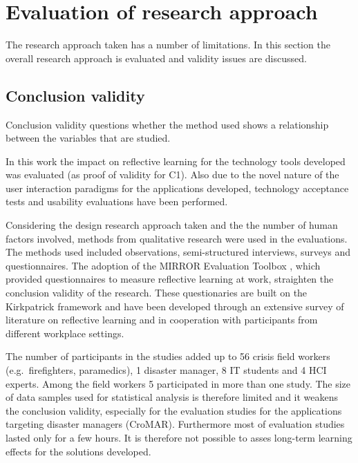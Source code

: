 \section{Evaluation of research approach}\label{evaluation-of-research-approach}

The research approach taken has a number of limitations. In this section the overall research approach is evaluated and validity issues are discussed.

\subsection{Conclusion validity}\label{conclusion-validity}

Conclusion validity questions whether the method used shows a relationship between the variables that are studied.

In this work the impact on reflective learning for the technology tools developed was evaluated (as proof of validity for C1). Also due to the novel nature of the user interaction paradigms for the applications developed, technology acceptance tests and usability evaluations have been performed.

Considering the design research approach taken and the the number of human factors involved, methods from qualitative research were used in the evaluations. The methods used included observations, semi-structured interviews, surveys and questionnaires. The adoption of the MIRROR Evaluation Toolbox \autocite{Renner:v4nLmwOk}, which provided questionnaires to measure reflective learning at work, straighten the conclusion validity of the research. These questionaries are built on the Kirkpatrick framework \autocite{kirkpatrick2009evaluating} and have been developed through an extensive survey of literature on reflective learning and in cooperation with participants from different workplace settings.

The number of participants in the studies added up to 56 crisis field workers (e.g.~firefighters, paramedics), 1 disaster manager, 8 IT students and 4 HCI experts. Among the field workers 5 participated in more than one study. The size of data samples used for statistical analysis is therefore limited and it weakens the conclusion validity, especially for the evaluation studies for the applications targeting disaster managers (CroMAR). Furthermore most of evaluation studies lasted only for a few hours. It is therefore not possible to asses long-term learning effects for the solutions developed.

